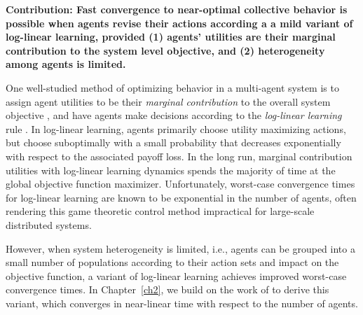
\smallskip

\noindent \textbf{Contribution: Fast convergence to near-optimal collective behavior is possible when agents revise their actions according a a mild variant of log-linear learning, provided (1) agents' utilities are their marginal contribution to the system level objective, and (2) heterogeneity among agents is limited.}




One well-studied method of optimizing behavior in a multi-agent system is to assign agent utilities to be their {\it marginal contribution} to the overall system objective \cite{Wolpert1999}, and have agents make decisions according to the {\it log-linear learning} rule \cite{Blume1993}. In log-linear learning, agents primarily choose utility maximizing actions, but choose suboptimally with a small probability that decreases exponentially with respect to the associated payoff loss. In the long run, marginal contribution utilities with log-linear learning dynamics spends the majority of time at the global objective function maximizer. Unfortunately, worst-case convergence times for log-linear learning are known to be exponential in the number of agents, \cite{Shah2010} often rendering this game theoretic control method impractical for large-scale distributed systems. 

However, when system heterogeneity is limited, i.e., agents can be grouped into a small number of populations according to their action sets and impact on the objective function, a variant of log-linear learning achieves improved worst-case convergence times. In Chapter~\ref{ch2}, we build on the work of \cite{Shah2010} to derive this variant, which converges in near-linear time with respect to the number of agents. 








